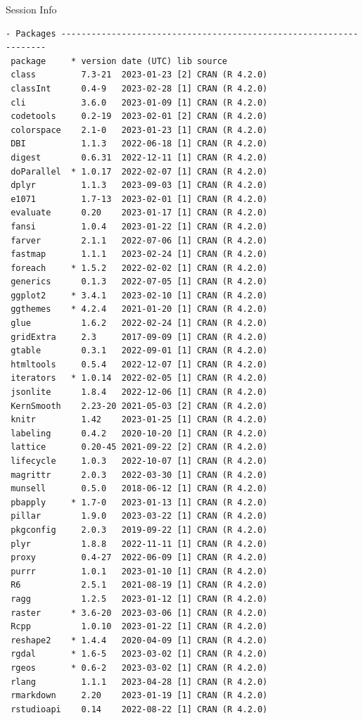 \documentclass[
  ignorenonframetext,
  aspectratio=169,
]{beamer}
\begin{document}
\begin{frame}[fragile]{Session Info}
\begin{verbatim}
- Packages -------------------------------------------------------------------
 package     * version date (UTC) lib source
 class         7.3-21  2023-01-23 [2] CRAN (R 4.2.0)
 classInt      0.4-9   2023-02-28 [1] CRAN (R 4.2.0)
 cli           3.6.0   2023-01-09 [1] CRAN (R 4.2.0)
 codetools     0.2-19  2023-02-01 [2] CRAN (R 4.2.0)
 colorspace    2.1-0   2023-01-23 [1] CRAN (R 4.2.0)
 DBI           1.1.3   2022-06-18 [1] CRAN (R 4.2.0)
 digest        0.6.31  2022-12-11 [1] CRAN (R 4.2.0)
 doParallel  * 1.0.17  2022-02-07 [1] CRAN (R 4.2.0)
 dplyr         1.1.3   2023-09-03 [1] CRAN (R 4.2.0)
 e1071         1.7-13  2023-02-01 [1] CRAN (R 4.2.0)
 evaluate      0.20    2023-01-17 [1] CRAN (R 4.2.0)
 fansi         1.0.4   2023-01-22 [1] CRAN (R 4.2.0)
 farver        2.1.1   2022-07-06 [1] CRAN (R 4.2.0)
 fastmap       1.1.1   2023-02-24 [1] CRAN (R 4.2.0)
 foreach     * 1.5.2   2022-02-02 [1] CRAN (R 4.2.0)
 generics      0.1.3   2022-07-05 [1] CRAN (R 4.2.0)
 ggplot2     * 3.4.1   2023-02-10 [1] CRAN (R 4.2.0)
 ggthemes    * 4.2.4   2021-01-20 [1] CRAN (R 4.2.0)
 glue          1.6.2   2022-02-24 [1] CRAN (R 4.2.0)
 gridExtra     2.3     2017-09-09 [1] CRAN (R 4.2.0)
 gtable        0.3.1   2022-09-01 [1] CRAN (R 4.2.0)
 htmltools     0.5.4   2022-12-07 [1] CRAN (R 4.2.0)
 iterators   * 1.0.14  2022-02-05 [1] CRAN (R 4.2.0)
 jsonlite      1.8.4   2022-12-06 [1] CRAN (R 4.2.0)
 KernSmooth    2.23-20 2021-05-03 [2] CRAN (R 4.2.0)
 knitr         1.42    2023-01-25 [1] CRAN (R 4.2.0)
 labeling      0.4.2   2020-10-20 [1] CRAN (R 4.2.0)
 lattice       0.20-45 2021-09-22 [2] CRAN (R 4.2.0)
 lifecycle     1.0.3   2022-10-07 [1] CRAN (R 4.2.0)
 magrittr      2.0.3   2022-03-30 [1] CRAN (R 4.2.0)
 munsell       0.5.0   2018-06-12 [1] CRAN (R 4.2.0)
 pbapply     * 1.7-0   2023-01-13 [1] CRAN (R 4.2.0)
 pillar        1.9.0   2023-03-22 [1] CRAN (R 4.2.0)
 pkgconfig     2.0.3   2019-09-22 [1] CRAN (R 4.2.0)
 plyr          1.8.8   2022-11-11 [1] CRAN (R 4.2.0)
 proxy         0.4-27  2022-06-09 [1] CRAN (R 4.2.0)
 purrr         1.0.1   2023-01-10 [1] CRAN (R 4.2.0)
 R6            2.5.1   2021-08-19 [1] CRAN (R 4.2.0)
 ragg          1.2.5   2023-01-12 [1] CRAN (R 4.2.0)
 raster      * 3.6-20  2023-03-06 [1] CRAN (R 4.2.0)
 Rcpp          1.0.10  2023-01-22 [1] CRAN (R 4.2.0)
 reshape2    * 1.4.4   2020-04-09 [1] CRAN (R 4.2.0)
 rgdal       * 1.6-5   2023-03-02 [1] CRAN (R 4.2.0)
 rgeos       * 0.6-2   2023-03-02 [1] CRAN (R 4.2.0)
 rlang         1.1.1   2023-04-28 [1] CRAN (R 4.2.0)
 rmarkdown     2.20    2023-01-19 [1] CRAN (R 4.2.0)
 rstudioapi    0.14    2022-08-22 [1] CRAN (R 4.2.0)

\end{verbatim}
\end{frame}
\end{document}
